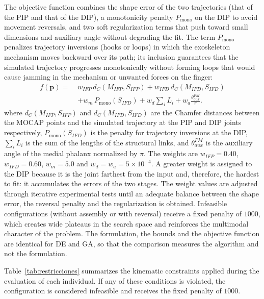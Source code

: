 \documentclass[conference]{IEEEtran}
\begin{document}
The objective function combines the shape error of the two trajectories (that of
the PIP and that of the DIP), a monotonicity penalty $P_{\text{mono}}$ on the DIP
to avoid movement reversals, and two soft regularization terms that push toward
small dimensions and auxiliary angle without degrading the fit. The term
$P_{\text{mono}}$ penalizes trajectory inversions (hooks or loops) in which the
exoskeleton mechanism moves backward over its path; its inclusion guarantees that
the simulated trajectory progresses monotonically without forming loops that
would cause jamming in the mechanism or unwanted forces on the finger:
\begin{align}
f(\mathbf{p}) =\;& w_{IFP}\,d_C(M_{IFP},S_{IFP}) + w_{IFD}\,d_C(M_{IFD},S_{IFD}) \nonumber\\
& + w_{m}\,P_{\text{mono}}(S_{IFD}) + w_{d}\!\sum_{i}\!L_i + w_{a}\frac{\theta_{aux}^{FM}}{\pi}.
\label{eq:obj}
\end{align}
where $d_C(M_{IFP},S_{IFP})$ and $d_C(M_{IFD},S_{IFD})$ are the Chamfer distances
between the MOCAP points and the simulated trajectory at the PIP and DIP joints
respectively, $P_{\text{mono}}(S_{IFD})$ is the penalty for trajectory inversions
at the DIP, $\sum_{i} L_i$ is the sum of the lengths of the structural links, and
$\theta_{aux}^{FM}$ is the auxiliary angle of the medial phalanx normalized by
$\pi$. The weights are $w_{IFP}=0.40$, $w_{IFD}=0.60$, $w_{m}=5.0$ and
$w_{d}=w_{a}=5\times10^{-4}$. A greater weight is assigned to the DIP because it
is the joint farthest from the input and, therefore, the hardest to fit: it
accumulates the errors of the two stages. The weight values are adjusted through
iterative experimental tests until an adequate balance between the shape error,
the reversal penalty and the regularization is obtained. Infeasible
configurations (without assembly or with reversal) receive a fixed penalty of
$1000$, which creates wide plateaus in the search space and reinforces the
multimodal character of the problem. The formulation, the bounds and the
objective function are identical for DE and GA, so that the comparison measures
the algorithm and not the formulation.

Table~\ref{tab:restricciones} summarizes the kinematic constraints applied during
the evaluation of each individual. If any of these conditions is violated, the
configuration is considered infeasible and receives the fixed penalty of $1000$.
\end{document}
